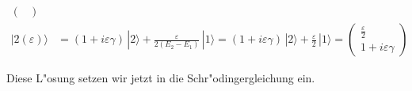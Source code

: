 \begin{loesung}
\begin{teilaufgaben}
\begin{align*}
\begin{pmatrix}
\end{pmatrix}
\\
|2(\varepsilon)\rangle
&=
(1+i\varepsilon\gamma)\,|2\rangle
	+ \frac{\varepsilon}{2(E_2-E_1)}\,|1\rangle
=
(1+i\varepsilon\gamma)\,|2\rangle
	+ \frac{\varepsilon}{2}\,|1\rangle
=
\begin{pmatrix}
\displaystyle\frac{\varepsilon}2
\\
1+i\varepsilon\gamma
\end{pmatrix}
\end{align*}
\item
Diese L"osung setzen wir jetzt in die Schr"odingergleichung ein.
\end{teilaufgaben}
\end{loesung}

